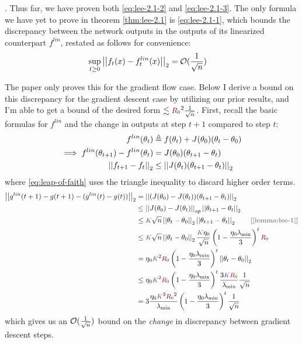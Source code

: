 \documentclass{article}
\newcommand\mc{\mathcal}
\begin{document}
\begin{appendices}
. Thus far, we have proven both \ref{eq:lee-2.1-2} and \ref{eq:lee-2.1-3}. The only formula we have yet to prove in theorem \ref{thm:lee-2.1} is \ref{eq:lee-2.1-1}, which bounds the discrepancy between the network outputs in the outputs of its linearized counterpart $f^{lin}$, restated as follows for convenience:
\begin{align}
	\sup_{t \geq 0} \norm{f_t(x) - f^{lin}_t(x)} 
	&= \mc O(\inv{\sqrt{n}}) 
\end{align}

The paper only proves this for the gradient flow case. Below I derive a bound on this discrepancy for the gradient descent case by utilizing our prior results, and I'm able to get a bound of the desired form $\lesssim \r^2 \inv{\sqrt n}$. First, recall the basic formulas for $f^{lin}$ and the change in outputs at step $t+1$ compared to step $t$:
\begin{align}
	f^{lin}(\theta_t)
		&\triangleq f(\theta_t) + J(\theta_0) (\theta_t - \theta_0) \\
	\implies f^{lin}(\theta_{t+1}) 
		- f^{lin}(\theta_t)
		&= J(\theta_0) (\theta_{t+1} - \theta_t) \\
	\left|\left| f_{t+1} - f_t \right|\right|_{2}
		&\leq \left|\left| J(\theta_t)(\theta_{t+1} - \theta_t) \right|\right|_{2} \label{eq:leap-of-faith}
\end{align}
where \ref{eq:leap-of-faith} uses the triangle inequality to discard higher order terms. 
\begin{align}
	\norm{g^{lin}(t+1) - g(t+1) -  (g^{lin}(t) - g(t))}	
		&= \norm{ (J(\theta_0) - J(\theta_t))(\theta_{t+1} - \theta_t) } \\
		&\leq \norm[op]{J(\theta_0) - J(\theta_t)} \norm{\theta_{t+1} - \theta_t} \\
		&\leq \k \sqrt{n} \norm{\theta_t - \theta_0} \norm{\theta_{t+1} - \theta_t} 
			\qquad \mtgray{[\ref{lemma:lee-1}]} \\
		&\leq \k \sqrt{n}  \norm{\theta_t - \theta_0}  
			\frac{\k \eta_0}{\sqrt{n}} \lr{1 - \frac{\eta_0 \lambda_{\text{min}}}{3}}^t \r \\
		&= \eta_0 \k^2 \r  \lr{1 - \frac{\eta_0 \lambda_{\text{min}}}{3}}^t   \norm{\theta_t - \theta_0}   \\
		&\leq  \eta_0 \k^2 \r  \lr{1 - \frac{\eta_0 \lambda_{\text{min}}}{3}}^t  \frac{    3 \k \r   }{\lambda_{\text{min}}} \inv{\sqrt n} \\
		&= 3 \frac{ \eta_0 \k^3 \r^2  }{ \lambda_{\text{min}}  } \lr{1 - \frac{\eta_0 \lambda_{\text{min}}}{3}}^t  \inv{\sqrt n}
\end{align}
which gives us an $\mc O(\inv{\sqrt n})$ bound on the \textit{change} in discrepancy between gradient descent steps. \\


\end{appendices}
\end{document}

